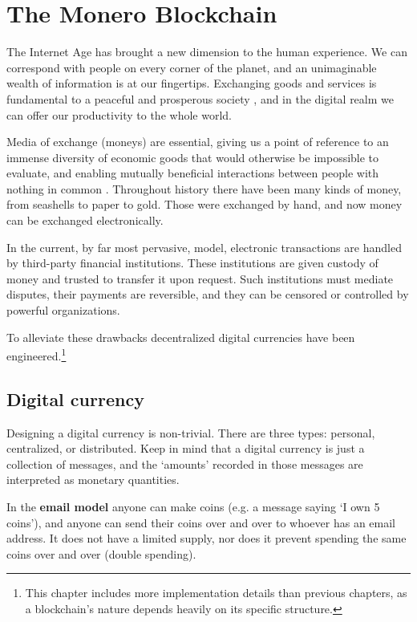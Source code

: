 \chapter{The Monero Blockchain}
\label{chapter:blockchain}

The Internet Age has brought a new dimension to the human experience. We can correspond with people on every corner of the planet, and an unimaginable wealth of information is at our fingertips. Exchanging goods and services is fundamental to a peaceful and prosperous society \cite{human-action}, and in the digital realm we can offer our productivity to the whole world.

Media of exchange (moneys) are essential, giving us a point of reference to an immense diversity of economic goods that would otherwise be impossible to evaluate, and enabling mutually beneficial interactions between people with nothing in common \cite{human-action}. Throughout history there have been many kinds of money, from seashells to paper to gold. Those were exchanged by hand, and now money can be exchanged electronically.

In the current, by far most pervasive, model, electronic transactions are handled by third-party financial institutions. These institutions are given custody of money and trusted to transfer it upon request. Such institutions must mediate disputes, their payments are reversible, and they can be censored or controlled by powerful organizations. \cite{Nakamoto_bitcoin}

To alleviate these drawbacks decentralized digital currencies have been engineered.\footnote{This chapter includes more implementation details than previous chapters, as a blockchain's nature depends heavily on its specific structure.}



\section{Digital currency}
\label{sec:digital-currency}

Designing a digital currency is non-trivial. There are three types: personal, centralized, or distributed. Keep in mind that a digital currency is just a collection of messages, and the `amounts' recorded in those messages are interpreted as monetary quantities.

In the \textbf{email model} anyone can make coins (e.g. a message saying `I own 5 coins'), and anyone can send their coins over and over to whoever has an email address. It does not have a limited supply, nor does it prevent spending the same coins over and over (double spending).

